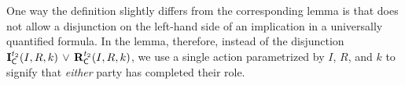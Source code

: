 
One way the definition slightly differs from the corresponding \mTamarin{} lemma
is that \mTamarin{} does not allow a disjunction on the left-hand side of an
implication in a universally quantified formula.
%
In the lemma, therefore, instead of the disjunction
$\mathbf{I}_{\textsf{C}}^{t_2}(I, R, k)\, \lor\,  \mathbf{R}_{\textsf{C}}^{t_2}(I, R, k)$,
we use a single action parametrized by $I$, $R$, and $k$ to signify that
\emph{either} party has completed their role. \\
%
